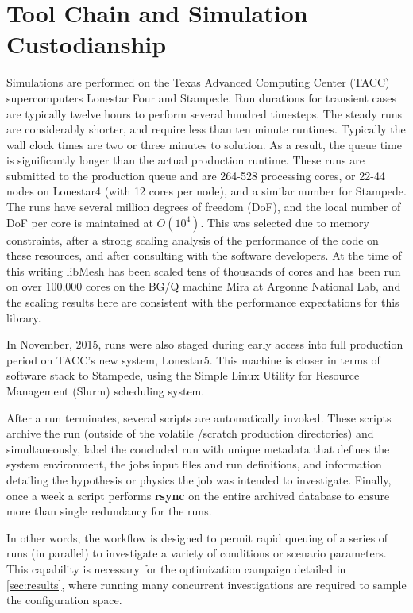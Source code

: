 \section{Tool Chain and Simulation Custodianship}

Simulations are performed on the Texas Advanced Computing Center (TACC)
supercomputers Lonestar Four and Stampede. Run durations for transient
cases are typically twelve hours to perform several hundred timesteps. 
The steady runs are considerably shorter, and require less
than ten minute runtimes. Typically  the wall clock times are two or
three minutes to solution. As a result, the queue time is significantly
longer than the actual production runtime. 
These runs are submitted to the production queue and are  
264-528 processing cores, or 22-44 nodes on Lonestar4 (with 12 cores per
node), and a similar number for Stampede. The runs have
several million degrees of freedom (DoF), and the local number of DoF
per core is maintained at $O(10^4)$. This was selected due to memory
constraints, after a strong scaling analysis of the performance of the
code on these resources, and after consulting with the software developers.  
At the time of this writing libMesh has been scaled tens of thousands of
cores and has been run on over 100,000 cores on the BG/Q machine Mira at
Argonne National Lab\cite{libmesh-scaling}, and the scaling results here
are consistent with the performance expectations for this library.

In November, 2015, runs were also staged during early access into full
production period on TACC's new system, Lonestar5. This machine is
closer in terms of software stack to Stampede, using the Simple Linux
Utility for Resource Management (Slurm)\cite{?} scheduling
system.  

After a run terminates, several scripts are automatically invoked. 
These scripts archive the run (outside of the volatile /scratch 
production directories) and simultaneously, label the concluded run with
unique metadata that defines the system environment, the jobs input
files and run definitions, and information detailing the
hypothesis or physics the job was intended to investigate. Finally, once
a week a script performs \textbf{rsync} on the entire archived database to
ensure more than single redundancy for the runs. 

In other words, the workflow is designed to permit rapid queuing of a
series of runs (in parallel) to investigate a variety of conditions or
scenario parameters. This capability is necessary for the optimization
campaign detailed in \ref{sec:results}, where running many concurrent
investigations are required to sample the configuration space.  



